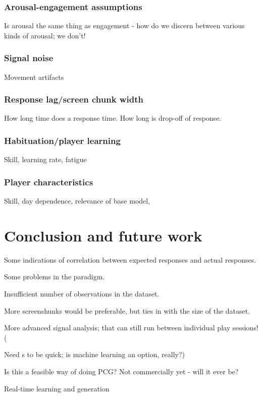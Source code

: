 \documentclass{llncs}
\begin{document}
\subsubsection{Arousal-engagement assumptions}
Is arousal the same thing as engagement - how do we discern between various kinds of arousal; we don't!
\subsubsection{Signal noise}
Movement artifacts
\subsubsection{Response lag/screen chunk width}
How long time does a response time. How long is drop-off of response.
\subsubsection{Habituation/player learning}
Skill, learning rate, fatigue
\subsubsection{Player characteristics}
Skill, day dependence, relevance of base model, 

\section{Conclusion and future work}
Some indications of correlation between expected responses and actual responses.

Some problems in the paradigm.

Insufficient number of observations in the dataset.

More screenshunks would be preferable, but ties in with the size of the dataset.

More advanced signal analysis; that can still run between individual play sessions! (

Need s to be quick; is machine learning an option, really?)

Is this a feasible way of doing PCG? Not commercially yet - will it ever be?

Real-time learning and generation


\end{document}
